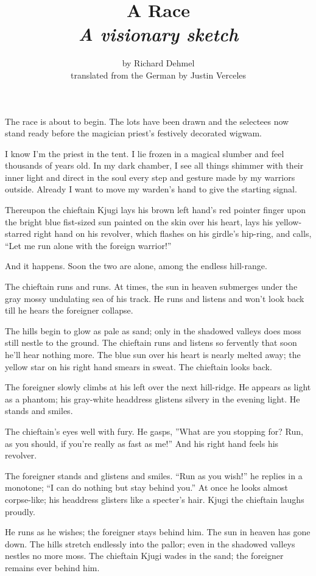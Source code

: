 \documentclass[12pt,a4paper]{article}
\title{A Race\\ \large{\textit{A visionary sketch}}}
\author{by Richard Dehmel\\translated from the German by Justin Verceles}
\date{}
\begin{document}
\maketitle

The race is about to begin. The lots have been drawn and the selectees now stand ready before the magician priest’s festively decorated wigwam.

I know I’m the priest in the tent. I lie frozen in a magical slumber and feel thousands of years old. In my dark chamber, I see all things shimmer with their inner light and direct in the soul every step and gesture made by my warriors outside. Already I want to move my warden’s hand to give the starting signal.

Thereupon the chieftain Kjugi lays his brown left hand’s red pointer finger upon the bright blue fist-sized sun painted on the skin over his heart, lays his yellow-starred right hand on his revolver, which flashes on his girdle’s hip-ring, and calls, “Let me run alone with the foreign warrior!”

And it happens. Soon the two are alone, among the endless hill-range.

The chieftain runs and runs. At times, the sun in heaven submerges under the gray mossy undulating sea of his track. He runs and listens and won’t look back till he hears the foreigner collapse. 

The hills begin to glow as pale as sand; only in the shadowed valleys does moss still nestle to the ground. The chieftain runs and listens so fervently that soon he’ll hear nothing more. The blue sun over his heart is nearly melted away; the yellow star on his right hand smears in sweat. The chieftain looks back.

The foreigner slowly climbs at his left over the next hill-ridge. He appears as light as a phantom; his gray-white headdress glistens silvery in the evening light. He stands and smiles.

The chieftain’s eyes well with fury. He gasps, ”What are you stopping for? Run, as you should, if you’re really as fast as me!” And his right hand feels his revolver.

The foreigner stands and glistens and smiles. “Run as you wish!” he replies in a monotone; “I can do nothing but stay behind you.” At once he looks almost corpse-like; his headdress glisters like a specter’s hair. Kjugi the chieftain laughs proudly.

He runs as he wishes; the foreigner stays behind him. The sun in heaven has gone down. The hills stretch endlessly into the pallor; even in the shadowed valleys nestles no more moss. The chieftain Kjugi wades in the sand; the foreigner remains ever behind him.
\end{document}
